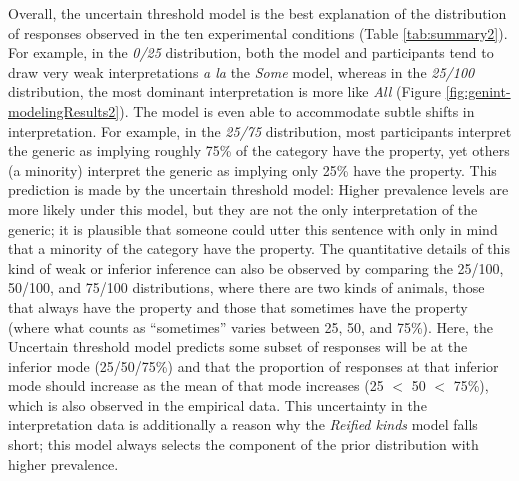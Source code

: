 \documentclass[floatsintext,man]{apa6}
\begin{document}
Overall, the uncertain threshold model is the best explanation of the distribution of responses observed in the ten experimental conditions (Table \ref{tab:summary2}). 
For example, in the \emph{0/25} distribution, both the model and participants tend to draw very weak interpretations \emph{a la} the \emph{Some} model, whereas in the \emph{25/100} distribution, the most dominant interpretation is more like \emph{All} (Figure \ref{fig:genint-modelingResults2}).
The model is even able to accommodate subtle shifts in interpretation.
For example, in the \emph{25/75} distribution, most participants interpret the generic as implying roughly 75\% of the category have the property, yet others (a minority) interpret the generic as implying only 25\% have the property. 
This prediction is made by the uncertain threshold model: Higher prevalence levels are more likely under this model, but they are not the only interpretation of the generic; it is plausible that someone could utter this sentence with only in mind that a minority of the category have the property. 
The quantitative details of this kind of weak or inferior inference can also be observed by comparing the 25/100, 50/100, and 75/100 distributions, where there are two kinds of animals, those that always have the property and those that sometimes have the property (where what counts as ``sometimes'' varies between 25, 50, and 75\%). 
Here, the Uncertain threshold model predicts some subset of responses will be at the inferior mode (25/50/75\%) and that the proportion of responses at that inferior mode should increase as the mean of that mode increases (25 $<$ 50 $<$ 75\%), which is also observed in the empirical data. 
This uncertainty in the interpretation data is additionally a reason why the \emph{Reified kinds} model falls short; this model always selects the component of the prior distribution with higher prevalence. 

\end{document}

